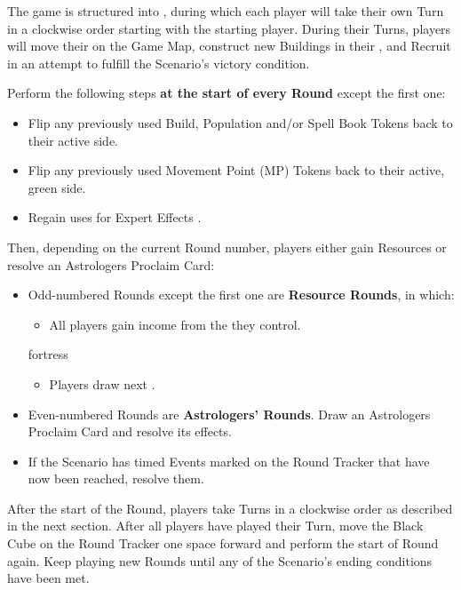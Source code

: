 
\begin{multicols*}{2}

The game is structured into , during which each player will take their own Turn in a clockwise order starting with the starting player.
During their Turns, players will move their  on the Game Map, construct new Buildings in their , and Recruit  in an attempt to fulfill the Scenario's victory condition.\par
Perform the following steps \textbf{at the start of every Round} except the first one:
\begin{itemize}
  \item Flip any previously used Build, Population and/or Spell Book Tokens back to their active side.
  \item Flip any previously used Movement Point (MP) Tokens back to their active, green side.
  \item Regain uses for Expert Effects .
\end{itemize}
Then, depending on the current Round number, players either gain Resources or resolve an Astrologers Proclaim Card:
\begin{itemize}
  \item Odd-numbered Rounds except the first one are \textbf{Resource Rounds}, in which:
    \begin{itemize}
      \item All players gain income from the  they control.
    \end{itemize}
    \iftoggle{printable}{\vspace*{-\baselineskip}}{}
    \begin{expansion}{fortress}
      \begin{itemize}
          \item Players draw next .
      \end{itemize}
    \end{expansion}
  \item Even-numbered Rounds are \textbf{Astrologers' Rounds}.
    Draw an Astrologers Proclaim Card and resolve its effects.
  \item If the Scenario has timed Events marked on the Round Tracker that have now been reached, resolve them.
\end{itemize}
After the start of the Round, players take Turns in a clockwise order as described in the next section.
After all players have played their Turn, move the Black Cube on the Round Tracker one space forward and perform the start of Round again.
Keep playing new Rounds until any of the Scenario's ending conditions have been met.


\end{multicols*}
